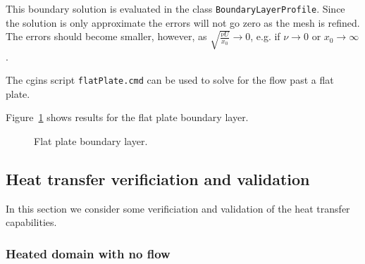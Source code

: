 This boundary solution is evaluated in the class {\tt BoundaryLayerProfile}.
Since the solution is only approximate the errors will not go zero as the mesh is refined.
The errors should become smaller, however, as $\sqrt{\frac{\nu U}{x_0}} \rightarrow 0$, e.g. 
if $\nu\rightarrow 0$ or $x_0\rightarrow\infty$. 


The cgins script {\tt flatPlate.cmd} can be used to solve for the flow past a flat plate.

Figure~\ref{fig:boundaryLayer} shows results for the flat plate boundary layer.

{
\newcommand{\figWidthp}{8.cm}
\newcommand{\trimfig}[2]{\trimPlotb{#1}{#2}{.0}{.0}{.0}{.0}}
\begin{figure}[hbt]
\begin{center}
\end{center}
  \caption{Flat plate boundary layer. }
  \label{fig:boundaryLayer}
\end{figure}
}



\clearpage
\subsection{Heat transfer verificiation and validation} \label{sec:heatTransferVerificationAndValidation}


In this section we consider some verificiation and validation of the heat transfer capabilities.


\subsubsection{Heated domain with no flow} \label{sec:heatedBox}

